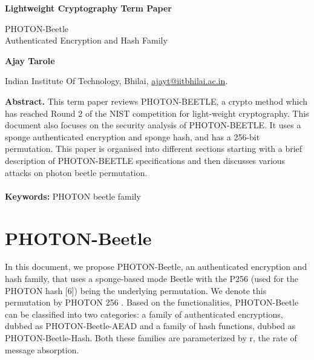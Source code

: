 \documentclass{article}
\begin{document}
\begin{titlepage}
	\begin{center}
		\vspace*{1cm}
		
		\textbf{Lightweight Cryptography Term Paper}
		
		\vspace{0.2cm}
		\large PHOTON-Beetle \\Authenticated Encryption and Hash Family
		
		\vspace{0.8cm}
		
		\textbf{Ajay Tarole}
		
	    \vspace{0.8cm}
	    
		Indian Institute Of Technology, Bhilai, \href{mailto:ajayt@iitbhilai.ac.in}{ajayt@iitbhilai.ac.in}.
	\end{center}
\textbf{Abstract.} This term paper reviews PHOTON-BEETLE, a crypto method which has reached Round 2 of the NIST competition for light-weight cryptography. This document also focuses on the security analysis of PHOTON-BEETLE.  It uses a sponge authenticated encryption and sponge hash, and has a 256-bit permutation.
This paper is organised into different sections starting with a brief description of PHOTON-BEETLE specifications and then discusses various attacks on photon beetle permutation.\\\\
\textbf{Keywords:} PHOTON beetle family
\end{titlepage}
\tableofcontents
\newpage
\section{PHOTON-Beetle}
In this document, we propose PHOTON-Beetle, an authenticated encryption and hash family, that uses a sponge-based mode Beetle with the P256 (used for the PHOTON hash [6]) being the underlying permutation. We denote this permutation by PHOTON 256 . Based on the functionalities, PHOTON-Beetle can be classified into two categories: a family of authenticated encryptions, dubbed as PHOTON-Beetle-AEAD and a family of hash functions, dubbed as PHOTON-Beetle-Hash. Both these families are parameterized by r, the rate of message absorption.\\\\
\end{document}
